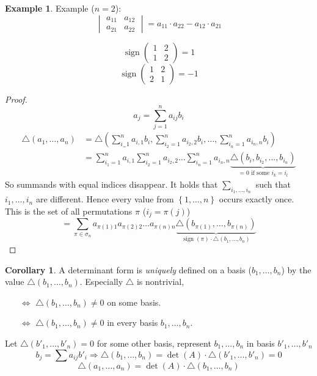 \documentclass[a4paper,landscape,twocolumn]{article}
\newcommand\set[1]{\left\{#1\right\}}
\theoremstyle{definition}
\newtheorem{ex}{Example}
\newtheorem{cor}{Corollary}
\DeclareMathOperator\sign{sign}
\begin{document}
%
\begin{ex}
  Example ($n=2$):
  \[
    \begin{vmatrix}
      a_{11} & a_{12} \\
      a_{21} & a_{22}
    \end{vmatrix}
    = a_{11} \cdot a_{22} - a_{12} \cdot a_{21}
  \]

  \[ \sign\begin{pmatrix} 1 & 2 \\ 1 & 2 \end{pmatrix} = 1 \]
  \[ \sign\begin{pmatrix} 1 & 2 \\ 2 & 1 \end{pmatrix} = -1 \]
\end{ex}
%
\begin{proof}
  \[ a_j = \sum_{j=1}^n a_{ij} b_i \]
  \begin{align*}
    \triangle(a_1, \ldots, a_n) &= \triangle\left(\sum_{i_=1}^n a_{i,1} b_i, \sum_{i_2=1}^n a_{i_2,2} b_i, \ldots, \sum_{i_n=1}^n a_{i_n,n} b_i\right) \\
      &= \sum_{i_1=1}^n a_{i,1} \sum_{i_2=1}^n a_{i_2,2} \ldots \sum_{i_n=1}^n a_{i_n,n} \underbrace{\triangle (b_i, b_{i_2}, \ldots, b_{i_n})}_{= 0 \text{ if some } i_k = i_l}
  \end{align*}
  So summands with equal indices disappear. It holds that
  $\sum_{i_1, \ldots, i_n}$ such that $i_1, \ldots, i_n$ are different.
  Hence every value from $\set{1, \ldots, n}$ occurs exactly once.
  This is the set of all permutations $\pi$ ($i_j = \pi(j)$)
  \[ = \sum_{\pi \in \sigma_n} a_{\pi(1) 1} a_{\pi(2) 2} \ldots a_{\pi(n) n} \underbrace{\triangle(b_{\pi(1)}, \ldots, b_{\pi(n)})}_{\sign(\pi) \cdot \triangle(b_1,\ldots,b_n)} \]
\end{proof}
\begin{cor}
  \label{cor-7.21}
  A determinant form is \emph{uniquely} defined on a basis ($b_1, \ldots, b_n$) by the value $\triangle(b_1, \ldots, b_n)$.
  Especially $\triangle$ is nontrivial,
  \begin{itemize}
    \item[$\Leftrightarrow$] $\triangle (b_1, \ldots, b_n) \neq 0$ on some basis.
    \item[$\Leftrightarrow$] $\triangle (b_1, \ldots, b_n) \neq 0$ in every basis $b_1, \ldots, b_n$.
  \end{itemize}

  Let $\triangle(b'_1, \ldots, b'_n) = 0$ for some other basis, represent $b_1, \ldots, b_n$ in basis $b'_1, \ldots, b'_n$
  \[ b_j = \sum a_{ij} b'_i \Rightarrow \triangle(b_1, \ldots, b_n) = \det(A) \cdot \triangle(b'_1, \ldots, b'_n) = 0 \]
  \[ \triangle(a_1, \ldots, a_n) = \det(A) \cdot \triangle(b_1, \ldots, b_n) \]
\end{cor}
\end{document}
